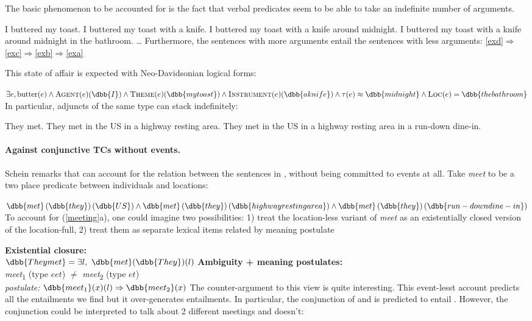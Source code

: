 The basic phenomenon to be accounted for is the fact that verbal predicates seem to be able to take an indefinite number of arguments.

\pex
\a I buttered my toast. \label{exa}
\a I buttered my toast with a knife. \label{exb}
\a I buttered my toast with a knife around midnight. \label{exc}
\a I buttered my toast with a knife around midnight in the bathroom. \label{exd}
\a \ldots
\xe
%
Furthermore, the sentences with more arguments entail the sentences with less arguments: \cref{exd}$\Rightarrow$\cref{exc}$\Rightarrow$\cref{exb}$\Rightarrow$\cref{exa}


This state of affair is expected with Neo-Davidsonian logical forms:

\ex
$\exists e, \text{butter}(e)\wedge \textsc{Agent}(e)(\dbb{I})\wedge \textsc{Theme}(e)(\dbb{my toast})\wedge \textsc{Instrument}(e)(\dbb{a knife})\wedge \tau(e)\approx \dbb{midnight}
 \wedge \textsc{Loc}(e) = \dbb{the bathroom}
$
\xe
%
In particular, adjuncts of the same type can stack indefinitely:

\pex\label{meeting}
\a They met.
\a They met in the US in a highway resting area.
\a They met in the US in a highway resting area in a run-down dine-in.
\xe
%
\paragraph{Against conjunctive TCs without events.}Schein remarks that can account for the relation between the sentences in \clastx, without being committed to events at all. Take \emph{meet} to be a two place predicate between individuals and locations:

\ex
$\dbb{met}\left(\dbb{they}\right)\left(\dbb{US}\right) \wedge\dbb{met}\left(\dbb{they}\right)\left(\dbb{highway resting area}\right) \wedge\dbb{met}\left(\dbb{they}\right)\left(\dbb{run-down dine-in}\right)$
\xe
%
To account for (\ref{meeting}a), one could imagine two possibilities: 1) treat the location-less variant of \emph{meet} as an existentially closed version of the location-full, 2) treat them as separate lexical items related by meaning postulate

\pex
\a \textbf{Existential closure:} \\
$\dbb{They met} = \exists l,\ \dbb{met}(\dbb{They})(l)$
\a \textbf{Ambiguity + meaning postulates:} \\
\emph{meet}\textsubscript{1} (type $eet$) $\neq$ \emph{meet}\textsubscript{2} (type $et$)\\
\emph{postulate:} $\dbb{meet\textsubscript{1}}(x)(l) \Rightarrow \dbb{meet\textsubscript{2}}(x)$
\xe
%
The counter-argument to this view is quite interesting. This event-lesst account predicts all the entailments we find but it over-generates entailments. In particular, the conjunction of \cnextx[a] and \cnextx[b] is predicted to entail \cnextx[c]. However, the conjunction could be interpreted to talk about 2 different meetings and \cnextx[c] doesn't:

